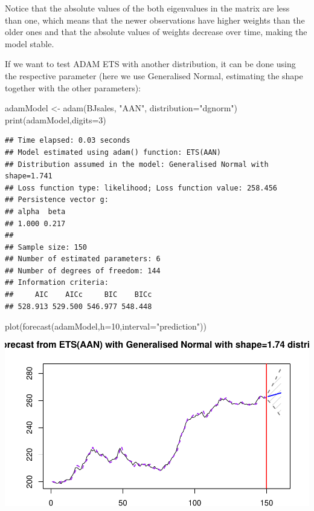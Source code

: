 \documentclass[
]{book}
\newenvironment{Shaded}{\begin{snugshade}}{\end{snugshade}}
\newcommand{\AttributeTok}[1]{\textcolor[rgb]{0.77,0.63,0.00}{#1}}
\newcommand{\DecValTok}[1]{\textcolor[rgb]{0.00,0.00,0.81}{#1}}
\newcommand{\FunctionTok}[1]{\textcolor[rgb]{0.00,0.00,0.00}{#1}}
\newcommand{\NormalTok}[1]{#1}
\newcommand{\OtherTok}[1]{\textcolor[rgb]{0.56,0.35,0.01}{#1}}
\newcommand{\StringTok}[1]{\textcolor[rgb]{0.31,0.60,0.02}{#1}}
\theoremstyle{definition}
\theoremstyle{definition}
\theoremstyle{definition}
\theoremstyle{definition}
\theoremstyle{remark}
\begin{document}
Notice that the absolute values of the both eigenvalues in the matrix are less than one, which means that the newer observations have higher weights than the older ones and that the absolute values of weights decrease over time, making the model stable.

If we want to test ADAM ETS with another distribution, it can be done using the respective parameter (here we use Generalised Normal, estimating the shape together with the other parameters):

\begin{Shaded}
\begin{Highlighting}[]
\NormalTok{adamModel }\OtherTok{\textless{}{-}} \FunctionTok{adam}\NormalTok{(BJsales, }\StringTok{"AAN"}\NormalTok{, }\AttributeTok{distribution=}\StringTok{"dgnorm"}\NormalTok{)}
\FunctionTok{print}\NormalTok{(adamModel,}\AttributeTok{digits=}\DecValTok{3}\NormalTok{)}
\end{Highlighting}
\end{Shaded}

\begin{verbatim}
## Time elapsed: 0.03 seconds
## Model estimated using adam() function: ETS(AAN)
## Distribution assumed in the model: Generalised Normal with shape=1.741
## Loss function type: likelihood; Loss function value: 258.456
## Persistence vector g:
## alpha  beta 
## 1.000 0.217 
## 
## Sample size: 150
## Number of estimated parameters: 6
## Number of degrees of freedom: 144
## Information criteria:
##     AIC    AICc     BIC    BICc 
## 528.913 529.500 546.977 548.448
\end{verbatim}

\begin{Shaded}
\begin{Highlighting}[]
\FunctionTok{plot}\NormalTok{(}\FunctionTok{forecast}\NormalTok{(adamModel,}\AttributeTok{h=}\DecValTok{10}\NormalTok{,}\AttributeTok{interval=}\StringTok{"prediction"}\NormalTok{))}
\end{Highlighting}
\end{Shaded}

\includegraphics{adam_files/figure-latex/unnamed-chunk-30-1.pdf}
\end{document}
